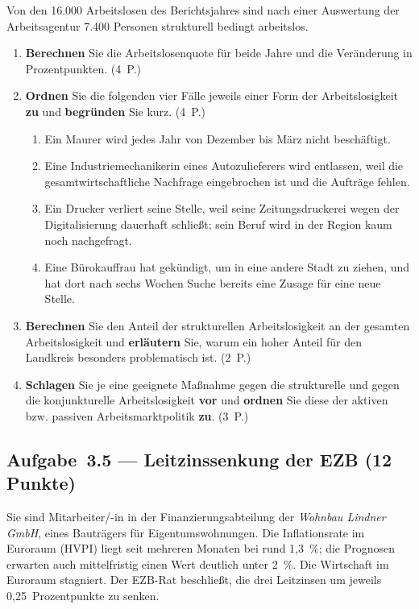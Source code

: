 Von den 16.000 Arbeitslosen des Berichtsjahres sind nach einer Auswertung der
Arbeitsagentur 7.400 Personen strukturell bedingt arbeitslos.

\begin{enumerate}[label=\alph*)]
  \item \textbf{Berechnen} Sie die Arbeitslosenquote für beide Jahre und die Veränderung
    in Prozentpunkten. \hfill (4~P.)
  \item \textbf{Ordnen} Sie die folgenden vier Fälle jeweils einer Form der
    Arbeitslosigkeit \textbf{zu} und \textbf{begründen} Sie kurz. \hfill (4~P.)
    \begin{enumerate}[label=(\arabic*)]
      \item Ein Maurer wird jedes Jahr von Dezember bis März nicht beschäftigt.
      \item Eine Industriemechanikerin eines Autozulieferers wird entlassen, weil die
        gesamtwirtschaftliche Nachfrage eingebrochen ist und die Aufträge fehlen.
      \item Ein Drucker verliert seine Stelle, weil seine Zeitungsdruckerei wegen der
        Digitalisierung dauerhaft schließt; sein Beruf wird in der Region kaum noch
        nachgefragt.
      \item Eine Bürokauffrau hat gekündigt, um in eine andere Stadt zu ziehen, und hat
        dort nach sechs Wochen Suche bereits eine Zusage für eine neue Stelle.
    \end{enumerate}
  \item \textbf{Berechnen} Sie den Anteil der strukturellen Arbeitslosigkeit an der
    gesamten Arbeitslosigkeit und \textbf{erläutern} Sie, warum ein hoher Anteil für den
    Landkreis besonders problematisch ist. \hfill (2~P.)
  \item \textbf{Schlagen} Sie je eine geeignete Maßnahme gegen die strukturelle und gegen
    die konjunkturelle Arbeitslosigkeit \textbf{vor} und \textbf{ordnen} Sie diese der
    aktiven bzw. passiven Arbeitsmarktpolitik \textbf{zu}. \hfill (3~P.)
\end{enumerate}

\subsection*{Aufgabe~3.5 --- Leitzinssenkung der EZB (12 Punkte)}

Sie sind Mitarbeiter/-in in der Finanzierungsabteilung der \emph{Wohnbau Lindner GmbH},
eines Bauträgers für Eigentumswohnungen. Die Inflationsrate im Euroraum (HVPI) liegt seit
mehreren Monaten bei rund 1,3~\%; die Prognosen erwarten auch mittelfristig einen Wert
deutlich unter 2~\%. Die Wirtschaft im Euroraum stagniert. Der EZB-Rat beschließt, die drei
Leitzinsen um jeweils 0,25~Prozentpunkte zu senken.

